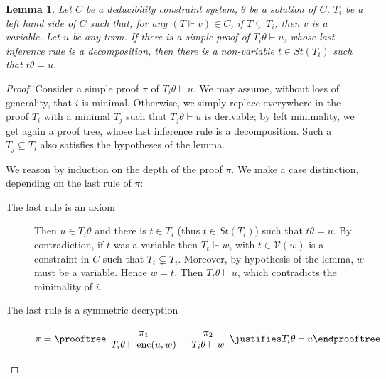 \documentclass[acmtocl,acmnow]{acmtrans2m}
\newtheorem{lemma}[theorem]{Lemma}
\newcommand{\var}{\mathcal{V}}
\newcommand{\st}{\mathit{St}}
\newcommand{\penc}[2]{\operatorname{enc}(#1,#2)}
\newcommand{\dedsys}[1]{deducibility constraint system}
\begin{document}
\begin{lemma}\label{lemma_axdec}
Let $C$ be a \dedsys{}, $\theta$ be a 
solution of $C$, $T_i$ be a left hand side of $C$ such that, for any
$(T\Vdash v)\in C$, if $T\subsetneq T_i$, then $v$ is a variable. Let
$u$ be any term. If there is a simple proof of $T_i\theta\vdash u$, whose
last inference rule is a decomposition, then there is a non-variable
$t\in\st(T_i)$ such that $t\theta=u$. 
\end{lemma}
\begin{proof}







Consider a simple proof $\pi$ of $T_i\theta\vdash u$. We may assume,
without loss of generality, that $i$ is minimal. Otherwise, we
simply replace everywhere in the proof $T_i$ with a minimal $T_j$ such that 
$T_j\theta\vdash u$ is derivable; by left minimality, we get again a proof tree,
whose last inference rule is a decomposition. Such a $T_j\subseteq T_i$ also
satisfies the hypotheses of the lemma. 


We reason by induction on the depth
of the proof $\pi$. We make a case distinction, depending on the last rule of $\pi$:

\begin{description}
\item[The last rule is an axiom] 
Then $u\in T_i\theta$ and there is $t\in T_i$ (thus $t\in\st(T_i)$)
such that $t\theta=u$. By contradiction, if $t$ was a variable then $T_t\Vdash w$, with $t\in \var(w)$ is a
constraint in $C$ such that $T_t\subsetneq T_i$. Moreover, by hypothesis of
the lemma, $w$ must be a variable. Hence $w=t$. Then $T_t\theta \vdash u$,
which contradicts the minimality of $i$.


\item[The last rule is a symmetric decryption]
\[ \pi= \prooftree
\begin{array}{c}\pi_1\\ T_i\theta\vdash \penc{u}{w}\end{array}\;
\;\begin{array}{c}\pi_2\\ T_i\theta\vdash w \end{array}
\justifies T_i\theta\vdash u
\endprooftree
\]


\end{description}
\end{proof}
\end{document}
